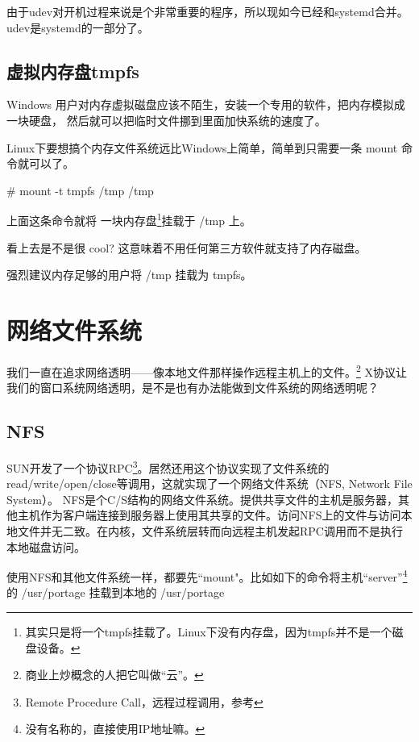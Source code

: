 由于udev对开机过程来说是个非常重要的程序，所以现如今已经和systemd合并。udev是systemd的一部分了。

\subsection{虚拟内存盘tmpfs}\label{sec:tmpfs}

Windows 用户对内存虚拟磁盘应该不陌生，安装一个专用的软件，把内存模拟成一块硬盘， 然后就可以把临时文件挪到里面加快系统的速度了。

Linux下要想搞个内存文件系统远比Windows上简单，简单到只需要一条 mount 命令就可以了。

\begin{code}
\# mount -t tmpfs /tmp /tmp
\end{code}

上面这条命令就将 一块内存盘\footnote{其实只是将一个tmpfs挂载了。Linux下没有内存盘，因为tmpfs并不是一个磁盘设备。}挂载于 /tmp 上。

看上去是不是很 cool? 这意味着不用任何第三方软件就支持了内存磁盘。

\begin{notice}
强烈建议内存足够的用户将 /tmp 挂载为 tmpfs。
\end{notice}

\section{网络文件系统}

我们一直在追求网络透明——像本地文件那样操作远程主机上的文件。\footnote{商业上炒概念的人把它叫做“云”。}
X协议让我们的窗口系统网络透明，是不是也有办法能做到文件系统的网络透明呢？

\subsection{NFS}

SUN开发了一个协议RPC\footnote{Remote Procedure Call，远程过程调用，参考 }。居然还用这个协议实现了文件系统的read/write/open/close等调用，这就实现了一个网络文件系统（NFS, Network File System）。
NFS是个C/S结构的网络文件系统。提供共享文件的主机是服务器，其他主机作为客户端连接到服务器上使用其共享的文件。访问NFS上的文件与访问本地文件并无二致。在内核，文件系统层转而向远程主机发起RPC调用而不是执行本地磁盘访问。

使用NFS和其他文件系统一样，都要先``mount"。比如如下的命令将主机``server''\footnote{没有名称的，直接使用IP地址嘛。}的 /usr/portage 挂载到本地的	/usr/portage


